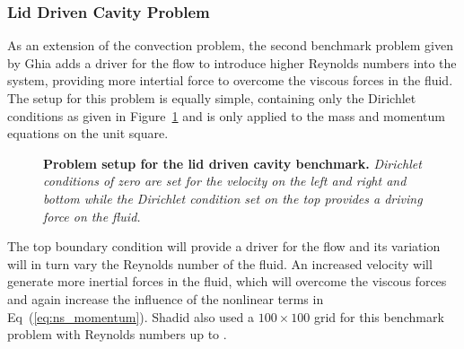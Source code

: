 \subsubsection{Lid Driven Cavity Problem}
\label{subsubsec:lid_driven_cavity}
As an extension of the convection problem, the second benchmark
problem given by Ghia \citep{ghia_high-re_1982} adds a driver for the
flow to introduce higher Reynolds numbers into the system, providing
more intertial force to overcome the viscous forces in the fluid. The
setup for this problem is equally simple, containing only the
Dirichlet conditions as given in Figure~\ref{fig:lid_driven_cavity}
and is only applied to the mass and momentum equations on the unit
square.
\begin{figure}[htpb!]
  \begin{center}
    \scalebox{1.5}{
       }
  \end{center}
  \caption{\textbf{Problem setup for the lid driven cavity benchmark.}
    \textit{Dirichlet conditions of zero are set for the velocity on
      the left and right and bottom while the Dirichlet condition set
      on the top provides a driving force on the fluid.}}
  \label{fig:lid_driven_cavity}
\end{figure}
The top boundary condition will provide a driver for the flow and its
variation will in turn vary the Reynolds number of the fluid. An
increased velocity will generate more inertial forces in the fluid,
which will overcome the viscous forces and again increase the
influence of the nonlinear terms in Eq~(\ref{eq:ns_momentum}). Shadid
also used a $100 \times 100$ grid for this benchmark problem with
Reynolds numbers up to .

